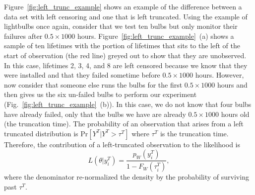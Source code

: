 Figure~\ref{fig:left_trunc_example} shows an example of the difference between a data set with left censoring and one that is left truncated. Using the example of lightbulbs once again, consider that we test ten bulbs but only monitor their failures after $0.5 \times 1000$ hours. Figure~\ref{fig:left_trunc_example}~(a) shows a sample of ten lifetimes with the portion of lifetimes that sits to the left of the start of observation (the red line) greyed out to show that they are unobserved. In this case, lifetimes 2, 3, 4, and 8 are left censored because we know that they were installed and that they failed sometime before $0.5 \times 1000$ hours. However, now consider that someone else runs the bulbs for the first $0.5 \times 1000$ hours and then gives us the six un-failed bulbs to perform our experiment (Fig.~\ref{fig:left_trunc_example}~(b)). In this case, we do not know that four bulbs have already failed, only that the bulbs we have are already $0.5 \times 1000$ hours old (the truncation time). The probability of an observation that arises from a left truncated distribution is $\text{Pr}\left[Y^T|Y^T > \tau^T\right]$ where $\tau^T$ is the truncation time. Therefore, the contribution of a left-truncated observation to the likelihood is
\begin{equation}
    \label{eq:left_trunc}
    L\left(\theta|y^T_i\right) = \frac{p_W\left(y^T_i\right)}{1 - F_W\left(\tau^{T}_i\right)},
\end{equation}
where the denominator re-normalized the density by the probability of surviving past $\tau^T$.


